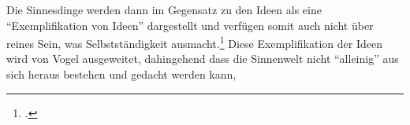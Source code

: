 Die Sinnesdinge werden dann im Gegensatz zu den Ideen als eine \enquote{Exemplifikation von Ideen} dargestellt und verfügen somit auch nicht über reines Sein, was Selbstständigkeit ausmacht.\footcite[vgl.][S. 146]{GraeserPhiloGeschichte}
Diese Exemplifikation der Ideen wird von Vogel ausgeweitet, dahingehend dass die Sinnenwelt nicht \enquote{alleinig} aus sich heraus bestehen und gedacht werden kann,
